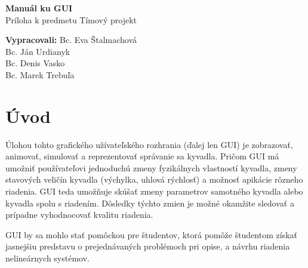 
\usepackage{parskip}%
\usepackage[dvipsnames]{xcolor}

\begin{titlepage}


\begin{center}
	\vspace*{5.5cm}
	 \textbf{\Huge Manuál ku GUI}\\
	 \vspace*{1cm}
	 Príloha k predmetu Tímový projekt	 
	
\end{center}
	\vspace*{9.5cm}
	\textbf{Vypracovali:} \hspace*{0.5cm} Bc. Eva Štalmachová\\
	 \hspace*{3.2cm} Bc. Ján Urdianyk\\ 
	 \hspace*{3.2cm} Bc. Denis Vasko\\
	 \hspace*{3.2cm} Bc. Marek Trebuľa
\end{titlepage}

\tableofcontents{}
\newpage


\section{Úvod}
Úlohou tohto grafického užívateľského rozhrania (ďalej len GUI) je zobrazovať, animovať, simulovať a reprezentovať správanie sa kyvadla. Pričom GUI má umožniť používateľovi jednoduchú zmeny fyzikálnych vlastností kyvadla, zmeny stavových veličín kyvadla (výchylka, uhlová rýchlosť) a možnosť apikácie rôzneho riadenia. GUI teda umožňuje skúšať zmeny parametrov samotného kyvadla alebo kyvadla spolu s riadením. Dôsledky týchto zmien je možné okamžite sledovať a prípadne vyhodnocovať kvalitu riadenia. 

GUI by sa mohlo stať pomôckou pre študentov, ktorá pomôže študentom získať jasnejšiu predstavu o prejednávaných problémoch pri opise, a návrhu riadenia nelineárnych systémov.

\newpage
